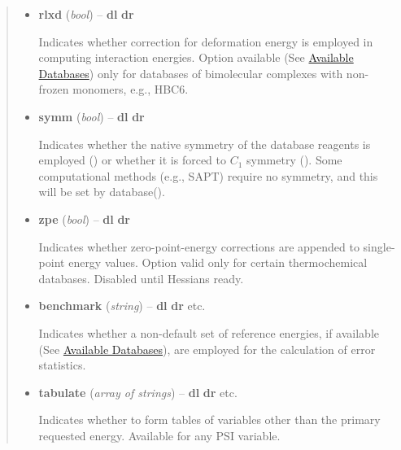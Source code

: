 \documentclass[letterpaper,10pt,english]{sphinxmanual}
\begin{document}
\begin{fulllineitems}
\begin{quote}
\begin{description}
\begin{itemize}
\item {} 
\textbf{rlxd} (\emph{bool}) -- 
 \textbar{}\textbar{} {\color{red}\bfseries{}\textbar{}dl\textbar{}}  {\color{red}\bfseries{}\textbar{}dr\textbar{}}

Indicates whether correction for deformation energy is
employed in computing interaction energies.  Option available
(See {\hyperref[db:available-databases]{Available Databases}}) only for databases of bimolecular complexes 
with non-frozen monomers, e.g., HBC6.


\item {} 
\textbf{symm} (\emph{bool}) -- 
{\color{red}\bfseries{}\textbar{}dl\textbar{}}  {\color{red}\bfseries{}\textbar{}dr\textbar{}} \textbar{}\textbar{} 

Indicates whether the native symmetry of the database reagents is
employed () or whether it is forced to $C_1$ symmetry
(). Some computational methods (e.g., SAPT) require no
symmetry, and this will be set by database().


\item {} 
\textbf{zpe} (\emph{bool}) -- 
 \textbar{}\textbar{} {\color{red}\bfseries{}\textbar{}dl\textbar{}}  {\color{red}\bfseries{}\textbar{}dr\textbar{}}

Indicates whether zero-point-energy corrections are appended to
single-point energy values. Option valid only for certain
thermochemical databases. Disabled until Hessians ready.


\item {} 
\textbf{benchmark} (\emph{string}) -- 
{\color{red}\bfseries{}\textbar{}dl\textbar{}}  {\color{red}\bfseries{}\textbar{}dr\textbar{}} \textbar{}\textbar{}  \textbar{}\textbar{} etc.

Indicates whether a non-default set of reference energies, if
available (See {\hyperref[db:available-databases]{Available Databases}}), are employed for the
calculation of error statistics.


\item {} 
\textbf{tabulate} (\emph{array of strings}) -- 
{\color{red}\bfseries{}\textbar{}dl\textbar{}} \code{{[}{]}} {\color{red}\bfseries{}\textbar{}dr\textbar{}} \textbar{}\textbar{}  \textbar{}\textbar{} etc.

Indicates whether to form tables of variables other than the
primary requested energy.  Available for any PSI variable.



\end{itemize}
\end{description}
\end{quote}
\end{fulllineitems}
\end{document}
